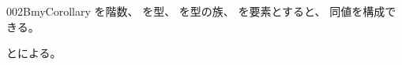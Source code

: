 \documentclass[index]{subfiles}
\begin{document}
\begin{myBlock}{002B}{myCorollary}
  を階数、
  を型、
  を型の族、
  を要素とすると、
  同値を構成できる。
\end{myBlock}
\begin{myProof}
  とによる。
\end{myProof}
\end{document}
